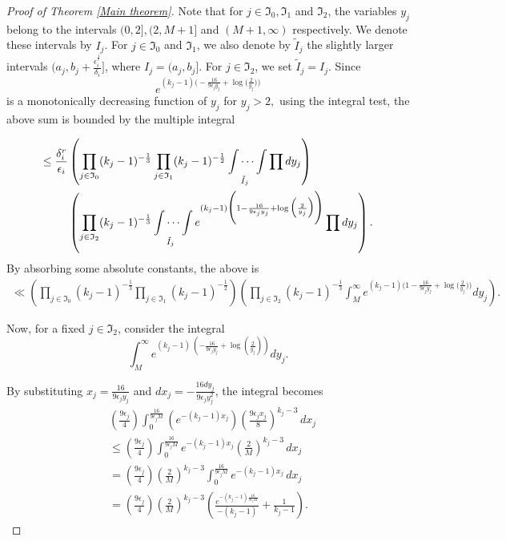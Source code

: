 \documentclass[reqno]{amsart}
\theoremstyle{plain}
\theoremstyle{definition}
\theoremstyle{remark}
\def\log{\operatorname{log}}
\begin{document}
\begin{proof}[Proof of Theorem \ref{Main theorem}]
Note that for $j \in \mathfrak{I}_0,\mathfrak{I}_1$ and $\mathfrak{I}_2$, the variables $y_j$ belong to the intervals $(0, 2], (2, M+1]$ and $(M+1, \infty)$ respectively. We denote these intervals by $I_j$. For $j \in \mathfrak{I}_0$ and $\mathfrak{I}_1$, we also denote by $\tilde I_j$ the slightly larger intervals $(a_j, b_j + \frac{\epsilon_i^{\frac{1}{r}}}{\delta_i}]$, where $I_j = (a_j, b_j]$. For $j \in \mathfrak{I}_2$, we set $\tilde I_j = I_j$. Since 
$$
e^{(k_{j}-1) \Big (-\frac{16}{ 9\epsilon_{j} y_{j}}+\log\Big(\frac{2}{y_{j}}\Big)\Big)}
$$ 
is a monotonically decreasing function of $y_j$ for $y_{j}>2,$
using the integral test, the above sum is bounded by the multiple integral

\begin{align*}
 \leq \frac{\delta_i^r}{\epsilon_i} & \left( \prod_{j \in \mathfrak{I}_0} (k_j - 1)^{-\frac{1}{3}}  \prod_{j \in \mathfrak{I}_1} (k_j - 1)^{-\frac{1}{2}} \idotsint\limits_{\tilde I_j} \prod dy_j\right) \\  &\left(\prod_{j \in \mathfrak{I}_2} (k_j - 1)^{-\frac{1}{3}} \idotsint\limits_{\tilde I_j}  e^{(k_{j}-1)\Bigg(1-\frac{16}{9\epsilon_{j} y_j}+\log\Big(\frac{2}{y_j}\Big)\Bigg)} \prod dy_j \right). 
\end{align*}
By absorbing some absolute constants, the above is
\begin{align}\label{alp}
 \ll   \left( \prod_{j \in \mathfrak{I}_0} (k_j - 1)^{-\frac{1}{3}}  \prod_{j \in \mathfrak{I}_1} (k_j - 1)^{-\frac{1}{2}}  \right) \left(\prod_{j \in \mathfrak{I}_2} (k_j - 1)^{-\frac{1}{3}} \int_M^\infty e^{(k_{j}-1)\Bigg(1-\frac{16}{9\epsilon_{j} y_j}+\log\Big(\frac{2}{y_j}\Big)\Bigg)} dy_j \right). 
\end{align}




Now, for a fixed $j \in \mathfrak{I}_2$, consider the integral 
$$
\int_M^\infty e^{(k_j - 1)\ \left( -\frac{16}{ 9\epsilon_{j} y_{j}}+ \log \left(\frac{2}{y_{j}}\right) \right)} dy_{j}.
$$ 

By  substituting $x_j = \frac{16}{9\epsilon_{j} y_{j}}$ and $dx_{j} = -\frac{16 dy_{j}}{9\epsilon_{j} y^2_j} $, the integral becomes 
\begin{align*}
& \left(\frac{9\epsilon_{j}  }{4}\right)  \int_0^{\frac{16}{9\epsilon_{j} M}}   \left(e^{-(k_{j}-1) x_{j}}\right)         \left(\frac{9\epsilon_{j} x_{j} }{8}\right)^{k_j-3} \, dx_{j} \\
& \leq \left(\frac{9\epsilon_{j}  }{4}\right) \int_0^{\frac{16}{9\epsilon_j M}}   e^{-(k_j -1) x_j}         \left(\frac{2 }{M}\right)^{k_j - 3}  \,dx_{j} \\
& = \left(\frac{9\epsilon_{j}  }{4}\right) \left(\frac{2 }{M}\right)^{k_j - 3}\int_0^{\frac{16}{9 \epsilon_j M}}   e^{-(k_j - 1) x_{j}}      \,dx_{j} \\ 
& =\left(\frac{9\epsilon_j  }{4}\right)  \left(\frac{2 }{M}\right)^{k_j-3}    
\left(  \frac{e^{-(k_j - 1)\frac{16}{9\epsilon_j M}}}{-(k_j - 1)}   + \frac{1}{k_j - 1} \right).
\end{align*}


\end{proof}
\end{document}
